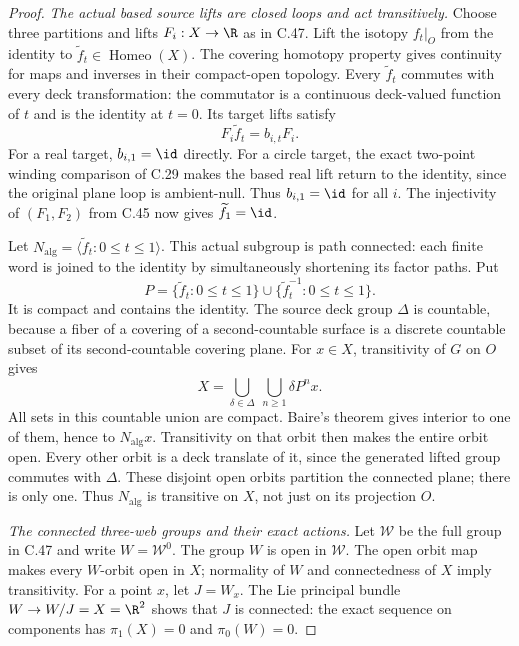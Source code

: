 \begin{proof}
\emph{The actual based source lifts are closed loops and act transitively.}
Choose three partitions and lifts $F_i:X\to\R$ as in C.47.
Lift the isotopy $f_t|_O$ from the identity to
$\widetilde f_t\in\operatorname{Homeo}(X)$.
The covering homotopy property gives continuity for maps and
inverses in their compact-open topology.
Every $\widetilde f_t$ commutes with every deck transformation:
the commutator is a continuous deck-valued function of $t$
and is the identity at $t=0$.
Its target lifts satisfy
\[
                    F_i\widetilde f_t=b_{i,t}F_i .
                                                        \tag{C.49.2}
\]
For a real target, $b_{i,1}=\id$ directly. For a circle target,
the exact two-point winding comparison of C.29 makes the
based real lift return to the identity, since the original
plane loop is ambient-null. Thus $b_{i,1}=\id$ for all $i$.
The injectivity of $(F_1,F_2)$ from C.45 now gives
$\widetilde f_1=\id$.

Let $N_{\mathrm{alg}}=\langle\widetilde f_t:0\leq t\leq1\rangle$.
This actual subgroup is path connected: each finite word is
joined to the identity by simultaneously shortening its
factor paths. Put
\[
 P=\{\widetilde f_t:0\leq t\leq1\}
       \cup\{\widetilde f_t^{-1}:0\leq t\leq1\}.
 \]
It is compact and contains the identity.
The source deck group $\Delta$ is countable, because a fiber
of a covering of a second-countable surface is a discrete
countable subset of its second-countable covering plane.
For $x\in X$, transitivity of $G$ on $O$ gives
\[
                       X=\bigcup_{\delta\in\Delta}
                            \ \bigcup_{n\geq1}\delta P^n x .
                                                        \tag{C.49.3}
\]
All sets in this countable union are compact.
Baire's theorem gives interior to one of them, hence to
$N_{\mathrm{alg}}x$. Transitivity on that orbit then makes
the entire orbit open.
Every other orbit is a deck translate of it, since the
generated lifted group commutes with $\Delta$.
These disjoint open orbits partition the connected plane;
there is only one. Thus $N_{\mathrm{alg}}$ is transitive
on $X$, not just on its projection $O$.

\emph{The connected three-web groups and their exact actions.}
Let $\mathcal W$ be the full group in C.47 and write
$W=\mathcal W^0$. The group $W$ is open in $\mathcal W$.
The open orbit map makes every $W$-orbit open in $X$;
normality of $W$ and connectedness of $X$ imply transitivity.
For a point $x$, let $J=W_x$.
The Lie principal bundle $W\to W/J=X=\R^2$ shows that
$J$ is connected: the exact sequence on components has
$\pi_1(X)=0$ and $\pi_0(W)=0$.


\end{proof}
